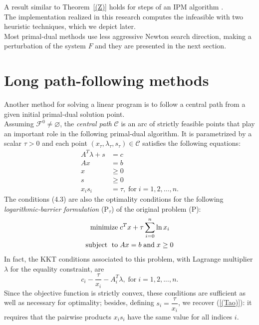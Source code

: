 \documentclass[a4paper,10 pt,titlepage,twoside]{book}
\theoremstyle{plain}
\theoremstyle{definition}
\theoremstyle{remark}
\begin{document}
A result similar to Theorem~\ref{(Z)} holds for steps of an IPM algorithm \cite{Wright}.\\ The implementation realized in this research computes the infeasible with two heuristic techniques, which we depict later.\\
Most primal-dual methods use less aggressive Newton search direction, making a perturbation of the system $F$ and they are presented in the next section.

\section{Long path-following methods}

Another method for solving a linear program is to follow a central path from a given initial primal-dual solution point.\\ Assuming $\mathcal{F}^{0}\neq \varnothing$, the \textit{central path} $\mathcal{C}$ is an arc of strictly feasible points that play an important role in the following primal-dual algorithm. It is parametrized by a scalar $\tau  > 0$ and each point $(x_{\tau}, \lambda_{\tau}, s_{\tau})\in \mathcal{C}$ satisfies the following equations:
\begin{align}
A^{T}\lambda+s&=c\tag{4.3a}\\
Ax&=b\tag{4.3b}\\\label{KKT2}
x&\geq 0\tag{4.3c}\\
s&\geq 0\tag{4.3d}\\
x_{i}s_{i}&= \tau,\; \text{for}\;i= 1,2,...,n.\tag{4.3e}\label{(Tao)}
\end{align} 
The conditions (4.3) are also the optimality conditions for the following \textit{logarithmic-barrier formulation} (P$_{\tau}$) of the original problem (P):
\begin{equation}\label{log}
\begin{split}
\text{minimize\;} &c^{T}x + \tau\sum_{i=0}^{n}\ln{x_{i}}\\
\text{subject\; to\;}&Ax = b\;\text{and\;} x\geq0
\end{split}
\end{equation}
In fact, the KKT conditions associated to this problem, with Lagrange multiplier $\lambda$ for the equality constraint, are
\begin{equation*}
c_{i} - \dfrac{\tau}{x_{i}} - A^{T}_{i}\lambda,\; \text{for}\;i = 1,2,...,n.
\end{equation*}  
Since the objective function is strictly convex, these conditions are sufficient as well as necessary for optimality; besides, defining $s_{i} = \dfrac{\tau}{x_{i}}$, we recover (\ref{(Tao)}): it requires that the pairwise products $x_{i}s_{i}$ have the same value for all indices $i$.\\[0.5cm]
\end{document}
